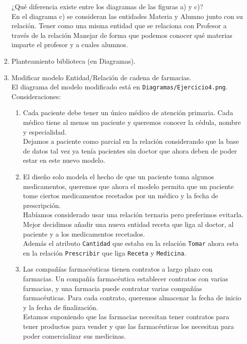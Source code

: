\documentclass[12pt,a4paper]{article}
\begin{document}
\begin{enumerate}
		¿Qué diferencia existe entre los diagramas de las figuras a) y c)?\\

		En el diagrama c) se consideran las entidades Materia y Alumno junto con su
		relación. Tener como una misma entidad que se relaciona con Profesor a través de la   relación Manejar de forma que podemos conocer qué materias imparte el profesor y a cuales alumnos.

		\newpage

	\item Planteamiento biblioteca (en Diagramas).
	
	\item Modificar modelo Entidad/Relación de cadena de farmacias.\\
		El diagrama del modelo modificado está en \texttt{Diagramas/Ejercicio4.png}.\\

		Consideraciones:\\
		\begin{enumerate}
			\item Cada paciente debe tener un único médico de atención primaria. Cada médico tiene al menos un paciente
				y queremos conocer la cédula, nombre y especialidad.\\

				Dejamos a paciente como parcial en la relación considerando que
				la base de datos tal vez ya tenía pacientes sin doctor que ahora
				deben de poder estar en este nuevo modelo.\\

			\item El diseño solo modela el hecho de que un paciente toma algunos medicamentos, queremos que ahora el modelo
				permita que un paciente tome ciertos medicamentos recetados por un médico y la fecha de prescripción.\\

				Habíamos considerado usar una relación ternaria pero preferimos evitarla.
				Mejor decidimos añadir una nueva entidad receta que liga al doctor, al paciente y a los medicamentos recetados.\\

				Además el atributo \texttt{Cantidad} que estaba en la relación \texttt{Tomar} ahora esta
				en la relación \texttt{Prescribir} que liga \texttt{Receta} y \texttt{Medicina}.\\

			\item Las compañías farmacéuticas tienen contratos a largo plazo con farmacias. Un compañía farmacéutica establecer
				contratos con varias farmacias, y una farmacia puede contratar varias compañías farmacéuticas. Para cada
				contrato, queremos almacenar la fecha de inicio y la fecha de finalización.\\

				Estamos suponiendo que las farmacias necesitan tener contratos para tener productos para vender y
				que las farmacéuticas los necesitan para poder comercializar sus medicinas.\\

		\end{enumerate}
\end{enumerate}
\end{document}
